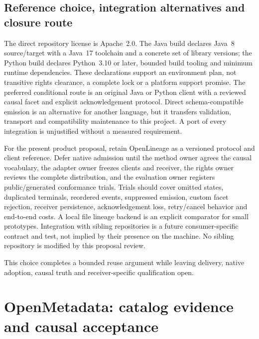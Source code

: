 \subsection{Reference choice, integration alternatives and closure route}
The direct repository license is Apache~2.0. The Java build declares Java~8
source/target with a Java~17 toolchain and a concrete set of library versions;
the Python build declares Python~3.10 or later, bounded build tooling and
minimum runtime dependencies. These declarations support an environment
plan, not transitive rights clearance, a complete lock or a platform support
promise. The preferred conditional route is an original Java or Python client
with a reviewed causal facet and explicit acknowledgement protocol. Direct
schema-compatible emission is an alternative for another language, but it
transfers validation, transport and compatibility maintenance to this project.
A port of every integration is unjustified without a measured requirement.
\citep{exec24_openlineage_source}

For the present product proposal, retain OpenLineage as a versioned protocol
and client reference. Defer native admission until the method owner agrees
the causal vocabulary, the adapter owner freezes clients and receiver,
the rights owner reviews the complete distribution, and the evaluation owner
registers public/generated conformance trials. Trials should cover omitted
states, duplicated terminals, reordered events, suppressed emission, custom
facet rejection, receiver persistence, acknowledgement loss, retry/cancel
behavior and end-to-end costs. A local file lineage backend is an explicit
comparator for small prototypes. Integration with sibling repositories is a
future consumer-specific contract and test, not implied by their presence
on the machine. No sibling repository is modified by this proposal review.

This choice completes a bounded reuse argument while leaving delivery,
native adoption, causal truth and receiver-specific qualification open.


\section{OpenMetadata: catalog evidence and causal acceptance}
\label{sec:exec24-openmetadata}

